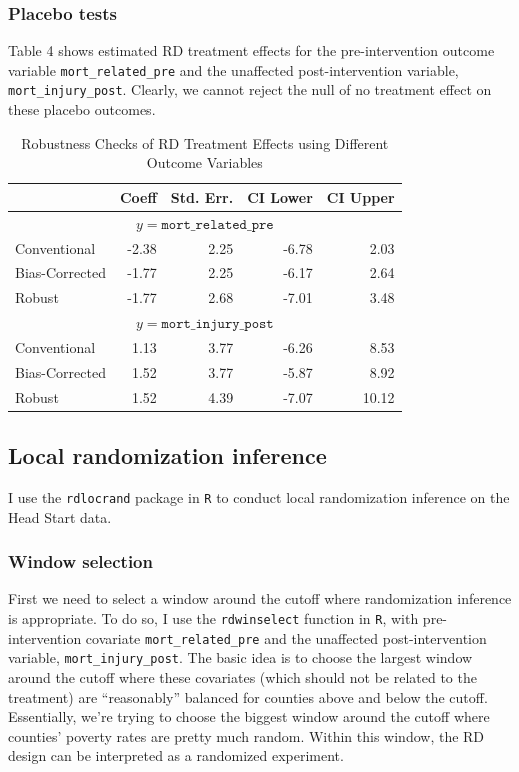 \documentclass[12pt]{article}
\begin{document}
\subsubsection{Placebo tests}
Table 4 shows estimated RD treatment effects for the pre-intervention outcome variable \verb|mort_related_pre| and the unaffected post-intervention variable, \verb|mort_injury_post|. Clearly, we cannot reject the null of no treatment effect on these placebo outcomes.

\begin{table}[htpb!]
\centering
\caption{Robustness Checks of RD Treatment Effects using Different Outcome Variables}
\begin{tabular}{lrrrr}
  \hline
 & Coeff & Std. Err. & CI Lower & CI Upper \\ 
  \hline
  \multicolumn{5}{c}{$y= \texttt{mort\_related\_pre}$}\\
  \hline
Conventional & -2.38 & 2.25 & -6.78 & 2.03 \\ 
  Bias-Corrected & -1.77 & 2.25 & -6.17 & 2.64 \\ 
  Robust & -1.77 & 2.68 & -7.01 & 3.48 \\ 
   \hline
 \multicolumn{5}{c}{$y= \texttt{mort\_injury\_post}$}\\
     \hline
Conventional & 1.13 & 3.77 & -6.26 & 8.53 \\ 
  Bias-Corrected & 1.52 & 3.77 & -5.87 & 8.92 \\ 
  Robust & 1.52 & 4.39 & -7.07 & 10.12 \\
   \hline
\end{tabular}
\end{table}

\subsection{Local randomization inference}
I use the \verb|rdlocrand| package in \verb|R| to conduct local randomization inference on the Head Start data.

\subsubsection{Window selection}
First we need to select a window around the cutoff where randomization inference is appropriate. To do so, I use the \verb|rdwinselect| function in \verb|R|, with pre-intervention covariate \verb|mort_related_pre| and the unaffected post-intervention variable, \verb|mort_injury_post|. The basic idea is to choose the largest window around the cutoff where these covariates (which should not be related to the treatment) are ``reasonably'' balanced for counties above and below the cutoff. Essentially, we're trying to choose the biggest window around the cutoff where counties' poverty rates are pretty much random. Within this window, the RD design can be interpreted as a randomized experiment.\\
\end{document}
